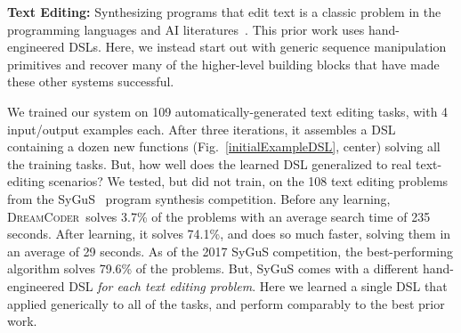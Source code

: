 \documentclass{article}
\newcommand{\system}{\textsc{DreamCoder}~}
\newcommand{\code}[1]{{\footnotesize\texttt{#1}}}
\newcommand{\probability}{\mathds{P}} %
\begin{document}
\textbf{Text Editing:} Synthesizing programs that edit text is a classic problem in the
programming languages and AI literatures~\cite{gulwani2011automating,lau2001programming}.
This prior work uses hand-engineered DSLs.
Here, we instead start out with generic sequence manipulation
primitives and recover many of the higher-level building blocks that 
have made these other systems successful.

We trained our system on 109 automatically-generated text editing tasks, with 4 input/output examples each.
After three iterations, it assembles a DSL containing a dozen new functions (Fig.~\ref{initialExampleDSL}, center) solving
all the training tasks.
But, how well does the  learned DSL generalized to real text-editing scenarios?
We tested, but did not train, on the 108 text editing problems from the SyGuS~\cite{alur2016sygus} program synthesis competition. Before any learning,
\system solves 3.7\% of the problems with an average search time of 235 seconds.
After learning,
it solves 74.1\%, and does so much faster,
solving them in an average of 29 seconds.
As of the 2017 SyGuS competition,
the best-performing algorithm solves 79.6\% of the problems.
But, SyGuS comes with a
different hand-engineered DSL \emph{for each text editing problem}. %
Here  we learned a single DSL
that applied generically to
all of the tasks,
and perform comparably to the best
prior work.
\end{document}
